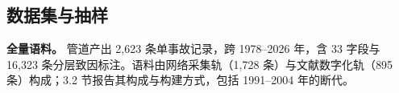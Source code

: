 \documentclass[11pt]{article}
\begin{document}
\subsection{{\cjkfont 数\allowbreak 据\allowbreak 集\allowbreak 与\allowbreak 抽\allowbreak 样}}
\textbf{{\cjkfont 全\allowbreak 量\allowbreak 语\allowbreak 料\allowbreak 。}} {\cjkfont 管\allowbreak 道\allowbreak 产\allowbreak 出} 2,623 {\cjkfont 条\allowbreak 单\allowbreak 事\allowbreak 故\allowbreak 记\allowbreak 录\allowbreak ，\allowbreak 跨} 1978--2026 {\cjkfont 年\allowbreak ，\allowbreak 含} 33 {\cjkfont 字\allowbreak 段\allowbreak 与} 16,323 {\cjkfont 条\allowbreak 分\allowbreak 层\allowbreak 致\allowbreak 因\allowbreak 标\allowbreak 注\allowbreak 。\allowbreak 语\allowbreak 料\allowbreak 由\allowbreak 网\allowbreak 络\allowbreak 采\allowbreak 集\allowbreak 轨\allowbreak （}1,728 {\cjkfont 条\allowbreak ）\allowbreak 与\allowbreak 文\allowbreak 献\allowbreak 数\allowbreak 字\allowbreak 化\allowbreak 轨\allowbreak （}895 {\cjkfont 条\allowbreak ）\allowbreak 构\allowbreak 成\allowbreak ；}3.2 {\cjkfont 节\allowbreak 报\allowbreak 告\allowbreak 其\allowbreak 构\allowbreak 成\allowbreak 与\allowbreak 构\allowbreak 建\allowbreak 方\allowbreak 式\allowbreak ，\allowbreak 包\allowbreak 括} 1991--2004 {\cjkfont 年\allowbreak 的\allowbreak 断\allowbreak 代\allowbreak 。}
\end{document}
